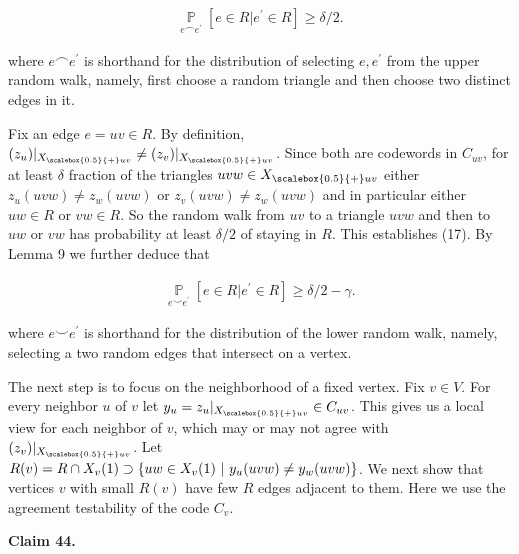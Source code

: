 \[\begin{gathered}
\operatorname*{\mathbb{P}}_{e\smallfrown e^{\prime}}[e\in R|e^{\prime}\in R]\geq\delta/2.
\end{gathered}\]


where $e\smallfrown e^{\prime}$ is shorthand for the distribution of selecting $e,e^{\prime}$ from the upper random walk, namely, first choose a random triangle and then choose two distinct edges in it.\par




Fix an edge $e=uv\in R$. By definition, $(z_{u})|_{{X}_{\scalebox{0.5}{+}uv}}\neq(z_{v})|_{{X}_{\scalebox{0.5}{+}uv}}$. Since both are codewords in $C_{uv}$, for at least $\delta$ fraction of the triangles $uvw\in{X}_{\scalebox{0.5}{+}uv}$ either $z_{u}(uvw)\neq z_{w}(uvw)$ or $z_{v}(uvw)\neq z_{w}(uvw)$ and in particular either $uw\in R$ or $vw\in R$. So the random walk from $uv$ to a triangle $uvw$ and then to $uw$ or $vw$ has probability at least $\delta/2$ of staying in $R$. This establishes (17).
By Lemma 9 we further deduce that\par


\[\begin{gathered}
\operatorname*{\mathbb{P}}_{e\smallsmile e^{\prime}}[e\in R|e^{\prime}\in R]\geq\delta/2-\gamma.
\end{gathered}\]


where $e\smallsmile e^{\prime}$ is shorthand for the distribution of the lower random walk, namely, selecting a two random edges that intersect on a vertex.\par




The next step is to focus on the neighborhood of a fixed vertex. Fix $v\in V$. For every neighbor $u$ of $v$ let $y_{u}=z_{u}|_{{X}_{\scalebox{0.5}{+}uv}}\in C_{uv}$. This gives us a local view for each neighbor of $v$, which may or may not agree with $(z_{v})|_{{X}_{\scalebox{0.5}{+}uv}}$. Let $R(v)=R\cap X_{v}(1)\supset\{uw\in X_{v}(1)\nobreak\ |\nobreak\ y_{u}(uvw)\not=y_{w}(uvw)\}$. We next show that vertices $v$ with small $R(v)$ have few $R$ edges adjacent to them. Here we use the agreement testability of the code $C_{v}$.\par





\par\medskip\noindent\textbf{
Claim 44. 
}\par



